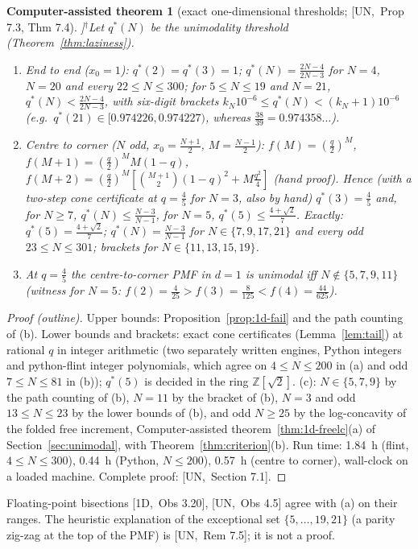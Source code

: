 \documentclass[10pt,a4paper]{article}
\theoremstyle{plain}
\newtheorem{catheorem}[theorem]{Computer-assisted theorem}
\theoremstyle{definition}
\newcommand{\NEW}{\ensuremath{^{\dagger}}}       %
\newcommand{\src}[2]{[\textsf{#1},~#2]}           %
\newcommand{\ONE}{\textsf{1D}}
\newcommand{\UNI}{\textsf{UN}}
\newcommand{\Z}{\mathbb{Z}}
\begin{document}
\begin{catheorem}[exact one-dimensional thresholds; \src{\UNI}{Prop 7.3, Thm 7.4}]\NEW\label{thm:1d-thresholds}
Let $q^*(N)$ be the unimodality threshold (Theorem~\ref{thm:laziness}).
\begin{enumerate}[label=(\alph*)]
\item End to end ($x_0=1$): $q^*(2)=q^*(3)=1$; $q^*(N)=\frac{2N-4}{2N-3}$ for $N=4$, $N=20$ and every $22\le N\le300$; for $5\le N\le19$ and $N=21$, $q^*(N)<\frac{2N-4}{2N-3}$, with six-digit brackets $k_N10^{-6}\le q^*(N)<(k_N+1)10^{-6}$ (e.g.\ $q^*(21)\in[0.974226,0.974227)$, whereas $\frac{38}{39}=0.974358\ldots$).
\item Centre to corner ($N$ odd, $x_0=\frac{N+1}2$, $M=\frac{N-1}2$): $f(M)=(\frac q2)^M$, $f(M+1)=(\frac q2)^MM(1-q)$, $f(M+2)=(\frac q2)^M[\binom{M+1}2(1-q)^2+M\frac{q^2}4]$ (hand proof). Hence (with a two-step cone certificate at $q=\frac45$ for $N=3$, also by hand) $q^*(3)=\frac45$ and, for $N\ge7$, $q^*(N)\le\frac{N-3}{N-1}$, for $N=5$, $q^*(5)\le\frac{4+\sqrt2}7$. Exactly: $q^*(5)=\frac{4+\sqrt2}7$; $q^*(N)=\frac{N-3}{N-1}$ for $N\in\{7,9,17,21\}$ and every odd $23\le N\le301$; brackets for $N\in\{11,13,15,19\}$.
\item At $q=\frac45$ the centre-to-corner PMF in $d=1$ is unimodal iff $N\notin\{5,7,9,11\}$ (witness for $N=5$: $f(2)=\frac4{25}>f(3)=\frac8{125}<f(4)=\frac{44}{625}$).
\end{enumerate}
\end{catheorem}
\begin{proof}[Proof (outline)]
Upper bounds: Proposition~\ref{prop:1d-fail} and the path counting of (b). Lower bounds and brackets: exact cone certificates (Lemma~\ref{lem:tail}) at rational $q$ in integer arithmetic (two separately written engines, Python integers and python-flint integer polynomials, which agree on $4\le N\le200$ in (a) and odd $7\le N\le81$ in (b)); $q^*(5)$ is decided in the ring $\Z[\sqrt2]$. (c): $N\in\{5,7,9\}$ by the path counting of (b), $N=11$ by the bracket of (b), $N=3$ and odd $13\le N\le23$ by the lower bounds of (b), and odd $N\ge25$ by the log-concavity of the folded free increment, Computer-assisted theorem~\ref{thm:1d-freelc}(a) of Section~\ref{sec:unimodal}, with Theorem~\ref{thm:criterion}(b). Run time: 1.84~h (flint, $4\le N\le300$), 0.44~h (Python, $N\le200$), 0.57~h (centre to corner), wall-clock on a loaded machine. Complete proof: \src{\UNI}{Section 7.1}.
\end{proof}
Floating-point bisections \src{\ONE}{Obs 3.20}, \src{\UNI}{Obs 4.5} agree with (a) on their ranges. The heuristic explanation of the exceptional set $\{5,\dots,19,21\}$ (a parity zig-zag at the top of the PMF) is \src{\UNI}{Rem 7.5}; it is not a proof.
\end{document}

